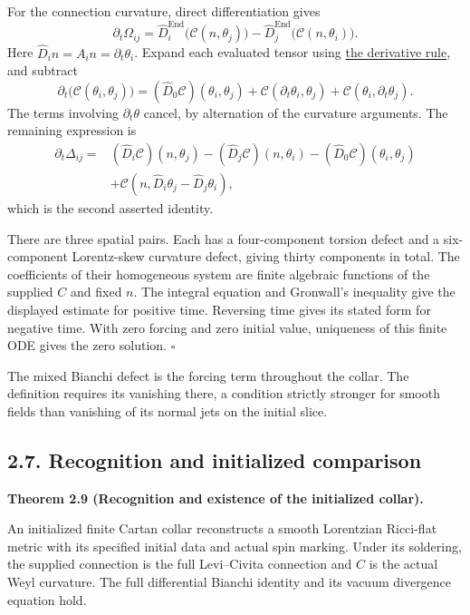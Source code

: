 \documentclass[
  english,
  11pt,
  reqno]{amsart}
\makeatletter
\newcommand{\pandocstatementheading}[1]{%
  \par\addpenalty{\@beginparpenalty}%
  \addvspace{.5\baselineskip plus .2\baselineskip minus .2\baselineskip}%
  {\normalfont\bfseries #1\par}%
  \nobreak\@afterindenttrue\@afterheading
}
\makeatother
\begin{document}
For the connection curvature, direct differentiation gives \[
\partial_t\Omega_{ij}
=\widehat D_i^{\operatorname{End}}\bigl(\mathcal C(n,\theta_j)\bigr)
-\widehat D_j^{\operatorname{End}}\bigl(\mathcal C(n,\theta_i)\bigr).
\] Here \(\widehat D_i n=A_i n=\partial_t\theta_i\). Expand each
evaluated tensor using
\hyperref[eq:online-cartan-evaluated-tensor-derivative]{the derivative
rule}, and subtract \[
\partial_t\bigl(\mathcal C(\theta_i,\theta_j)\bigr)
=(\widehat D_0\mathcal C)(\theta_i,\theta_j)
+\mathcal C(\partial_t\theta_i,\theta_j)
+\mathcal C(\theta_i,\partial_t\theta_j).
\] The terms involving \(\partial_t\theta\) cancel, by alternation of
the curvature arguments. The remaining expression is \[
\begin{aligned}
\partial_t\Delta_{ij}
={}&(\widehat D_i\mathcal C)(n,\theta_j)
-(\widehat D_j\mathcal C)(n,\theta_i)
-(\widehat D_0\mathcal C)(\theta_i,\theta_j)\\
&+\mathcal C(n,\widehat D_i\theta_j-\widehat D_j\theta_i),
\end{aligned}
\] which is the second asserted identity.

There are three spatial pairs. Each has a four-component torsion defect
and a six-component Lorentz-skew curvature defect, giving thirty
components in total. The coefficients of their homogeneous system are
finite algebraic functions of the supplied \(C\) and fixed \(n\). The
integral equation and Gronwall's inequality give the displayed estimate
for positive time. Reversing time gives its stated form for negative
time. With zero forcing and zero initial value, uniqueness of this
finite ODE gives the zero solution. \hfill\(\square\)

The mixed Bianchi defect is the forcing term throughout the collar. The
definition requires its vanishing there, a condition strictly stronger
for smooth fields than vanishing of its normal jets on the initial
slice.

\subsection{2.7. Recognition and initialized
comparison}\label{recognition-and-initialized-comparison}\label{sec:online-cartan-recognition-comparison}

\pandocstatementheading{\leavevmode{}\label{thm:online-cartan-collar-recognition}Theorem 2.9 (Recognition and existence of the initialized collar).}

An initialized finite Cartan collar reconstructs a smooth Lorentzian
Ricci-flat metric with its specified initial data and actual spin
marking. Under its soldering, the supplied connection is the full
Levi--Civita connection and \(C\) is the actual Weyl curvature. The full
differential Bianchi identity and its vacuum divergence equation hold.
\end{document}
